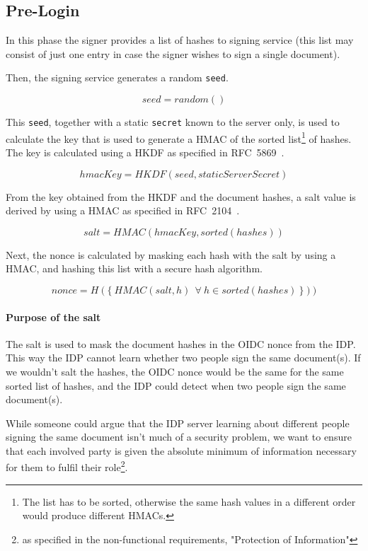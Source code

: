 \subsection{Pre-Login}\label{subsec:pre-login}
In this phase the signer provides a list of hashes to signing service
(this list may consist of just one entry in case the signer wishes to sign a single document).

Then, the signing service generates a random \texttt{seed}.

\[ seed = random() \]

This \texttt{seed}, together with a static \texttt{secret} known to the server only,
is used to calculate the key that is used to generate a \gls{HMAC}
of the sorted list\footnote{The list has to be sorted,
otherwise the same hash values in a different order would produce different \gls{HMAC}s.} of hashes.
The key is calculated using a \gls{HKDF} as specified in RFC~5869~\cite{rfc5869}.

\[ hmacKey = HKDF(seed, staticServerSecret) \]

From the key obtained from the \gls{HKDF} and the document hashes,
a salt value is derived by using a \gls{HMAC} as specified in RFC~2104~\cite{rfc2104}.

\[ salt = HMAC(hmacKey, sorted(hashes)) \]

Next, the nonce is calculated by masking each hash with the salt by using a \gls{HMAC},
and hashing this list with a secure hash algorithm.


\[ nonce = H(\{\ HMAC(salt, h) \ \ \forall \ h \in sorted(hashes)\ \})) \]


\paragraph{Purpose of the salt}
The salt is used to mask the document hashes in the \gls{OIDC} nonce from the \gls{IDP}.
This way the \gls{IDP} cannot learn whether two people sign the same document(s).
If we wouldn't salt the hashes, the \gls{OIDC} nonce would be the same for the same sorted list of hashes,
and the \gls{IDP} could detect when two people sign the same document(s).

While someone could argue that the IDP server learning about different people signing the same document
isn't much of a security problem, we want to ensure that each involved party is given the absolute minimum
of information necessary for them to fulfil their role\footnote{as specified in the non-functional requirements, "Protection of Information"}.

